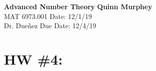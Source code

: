 \documentclass[letterpaper, 12pt]{article}
\begin{document}
\noindent
\large\textbf{Advanced Number Theory} \hfill \textbf{Quinn Murphey} \\
\normalsize MAT 6973.001 \hfill Date: 12/1/19 \\
Dr. Dueñez \hfill Due Date: 12/4/19 \\
\noindent\makebox[\linewidth]{\rule{\paperwidth}{0.4pt}}
\section*{HW \#4:}
 
 
 
\end{document}
